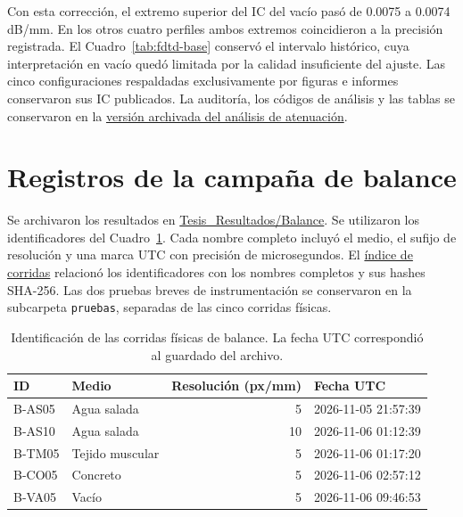 Con esta corrección, el extremo superior del IC del vacío pasó de 0.0075 a 0.0074 dB/mm. En los otros cuatro perfiles ambos extremos coincidieron a la precisión registrada. El Cuadro~\ref{tab:fdtd-base} conservó el intervalo histórico, cuya interpretación en vacío quedó limitada por la calidad insuficiente del ajuste. Las cinco configuraciones respaldadas exclusivamente por figuras e informes conservaron sus IC publicados. La auditoría, los códigos de análisis y las tablas se conservaron en la \href{https://github.com/JavierMencos/Resultados-de-Tesis/tree/0720a8d4f872b3a98538f2d91427c173715534f0/Tesis_Resultados/Atenuacion}{versión archivada del análisis de atenuación}.

\section{Registros de la campaña de balance}\label{an:balance-registros}
Se archivaron los resultados en \href{https://github.com/JavierMencos/Resultados-de-Tesis/tree/cfe106687c66daf53a6fc653ad23edda9b855882/Tesis_Resultados/Balance}{Tesis\_Resultados/Balance}. Se utilizaron los identificadores del Cuadro~\ref{tab:balance-identificadores}. Cada nombre completo incluyó el medio, el sufijo de resolución y una marca UTC con precisión de microsegundos. El \href{https://github.com/JavierMencos/Resultados-de-Tesis/blob/cfe106687c66daf53a6fc653ad23edda9b855882/Tesis_Resultados/Balance/tablas/indice_corridas.csv}{índice de corridas} relacionó los identificadores con los nombres completos y sus hashes SHA-256. Las dos pruebas breves de instrumentación se conservaron en la subcarpeta \texttt{pruebas}, separadas de las cinco corridas físicas.

\begin{table}[htbp]\centering\small
\caption{Identificación de las corridas físicas de balance. La fecha UTC correspondió al guardado del archivo.}\label{tab:balance-identificadores}
\begin{tabular}{llrl}\hline
ID & Medio & Resolución (px/mm) & Fecha UTC \\ \hline
B-AS05 & Agua salada & 5 & 2026-11-05 21:57:39 \\
B-AS10 & Agua salada & 10 & 2026-11-06 01:12:39 \\
B-TM05 & Tejido muscular & 5 & 2026-11-06 01:17:20 \\
B-CO05 & Concreto & 5 & 2026-11-06 02:57:12 \\
B-VA05 & Vacío & 5 & 2026-11-06 09:46:53 \\ \hline
\end{tabular}\end{table}

